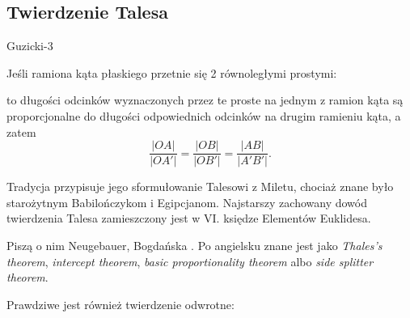 %

\subsection{Twierdzenie Talesa}
Guzicki-3

\begin{theorem}[Talesa]
    Jeśli ramiona kąta płaskiego przetnie się 2 równoległymi prostymi:
    \begin{center}
        \end{center}
    to długości odcinków wyznaczonych przez te proste na jednym z ramion kąta są proporcjonalne do długości odpowiednich odcinków na drugim ramieniu kąta, a zatem
    \begin{equation}
        \label{thales_ratio}
        \frac{|OA|}{|OA'|} = \frac{|OB|}{|OB'|} = \frac{|AB|}{|A'B'|}.
    \end{equation}
\end{theorem}

Tradycja przypisuje jego sformułowanie Talesowi z Miletu, chociaż znane było starożytnym Babilończykom i Egipcjanom.
%
Najstarszy zachowany dowód twierdzenia Talesa zamieszczony jest w VI. księdze Elementów Euklidesa. 

Piszą o nim Neugebauer, Bogdańska \cite[s. 48-56]{neugebauer_2018}.
Po angielsku znane jest jako \emph{Thales's theorem}, \emph{intercept theorem}, \emph{basic proportionality theorem} albo \emph{side splitter theorem}.

Prawdziwe jest również twierdzenie odwrotne:

